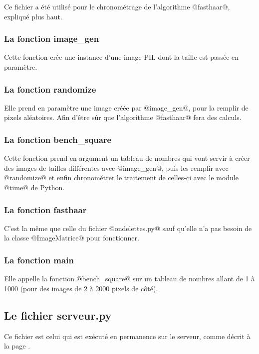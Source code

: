 \documentclass{article}
\begin{document}
Ce fichier a été utilisé pour le chronométrage de l'algorithme @fasthaar@, expliqué plus haut.

\subsubsection{La fonction image\_gen}

Cette fonction crée une instance d'une image PIL dont la taille est passée en paramètre.

\subsubsection{La fonction randomize}

Elle prend en paramètre une image créée par @image_gen@, pour la remplir de pixels aléatoires. Afin d'être sûr que l'algorithme @fasthaar@ fera des calculs.

\subsubsection{La fonction bench\_square}

Cette fonction prend en argument un tableau de nombres qui vont servir à créer des images de tailles différentes avec @image_gen@, puis les remplir avec @randomize@ et enfin chronométrer le traitement de celles-ci avec le module @time@ de Python.

\subsubsection{La fonction fasthaar}

C'est la même que celle du fichier @ondelettes.py@ sauf qu'elle n'a pas besoin de la classe @ImageMatrice@ pour fonctionner.

\subsubsection{La fonction main}

Elle appelle la fonction @bench_square@ sur un tableau de nombres allant de 1 à 1000 (pour des images de 2 à 2000 pixels de côté).



\subsection{Le fichier serveur.py}


Ce fichier est celui qui est exécuté en permanence sur le serveur, comme décrit à la page \pageref{net}.
\end{document}
